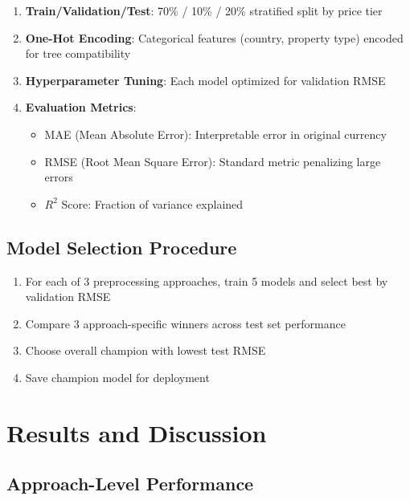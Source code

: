 \documentclass[12pt,a4paper]{article}
\begin{document}
\begin{enumerate}
    \item \textbf{Train/Validation/Test}: 70\% / 10\% / 20\% stratified split by price tier
    \item \textbf{One-Hot Encoding}: Categorical features (country, property type) encoded for tree compatibility
    \item \textbf{Hyperparameter Tuning}: Each model optimized for validation RMSE
    \item \textbf{Evaluation Metrics}: 
    \begin{itemize}
        \item MAE (Mean Absolute Error): Interpretable error in original currency
        \item RMSE (Root Mean Square Error): Standard metric penalizing large errors
        \item $R^2$ Score: Fraction of variance explained
    \end{itemize}
\end{enumerate}

\subsection{Model Selection Procedure}

\begin{enumerate}
    \item For each of 3 preprocessing approaches, train 5 models and select best by validation RMSE
    \item Compare 3 approach-specific winners across test set performance
    \item Choose overall champion with lowest test RMSE
    \item Save champion model for deployment
\end{enumerate}

\section{Results and Discussion}

\subsection{Approach-Level Performance}
\end{document}
